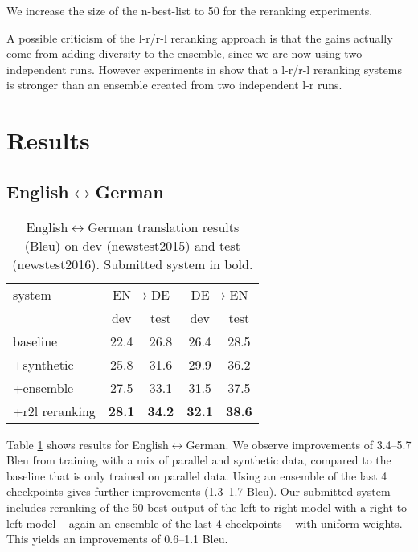 \documentclass[11pt]{article}
\begin{document}
We increase the size of the n-best-list to 50 for the reranking experiments.

A possible criticism of the l-r/r-l reranking approach is that the gains actually come from adding diversity to the ensemble, since we
are now using two independent runs. However experiments in \cite{liu2016} show that a l-r/r-l reranking systems is
stronger than an ensemble created from two independent l-r runs.


\section{Results}

\subsection{English$\leftrightarrow$German}

\begin{table}
\centering
\begin{tabular}{l|cc|cc}
system & \multicolumn{2}{c|}{EN$\to$DE} & \multicolumn{2}{c}{DE$\to$EN}\\
& dev & test & dev & test\\
\hline
baseline & 22.4 & 26.8 &26.4 & 28.5\\+synthetic & 25.8 & 31.6&29.9 & 36.2\\ +ensemble & 27.5 & 33.1 &31.5 & 37.5\\ +r2l reranking & \textbf{28.1} & \textbf{34.2} &\textbf{32.1} & \textbf{38.6}\\ \end{tabular}
\caption{English$\leftrightarrow$German translation results ({\sc Bleu}) on dev (newstest2015) and test (newstest2016). Submitted system in bold.}
\label{results-de}
\end{table}

Table \ref{results-de} shows results for English$\leftrightarrow$German.
We observe improvements of 3.4--5.7 {\sc Bleu} from training with a mix of parallel and synthetic data, compared to the baseline that is only trained on parallel data.
Using an ensemble of the last 4 checkpoints gives further improvements (1.3--1.7 {\sc Bleu}).
Our submitted system includes reranking of the 50-best output of the left-to-right model with a right-to-left model -- again an ensemble of the last 4 checkpoints -- with uniform weights.
This yields an improvements of 0.6--1.1 {\sc Bleu}.
\end{document}
